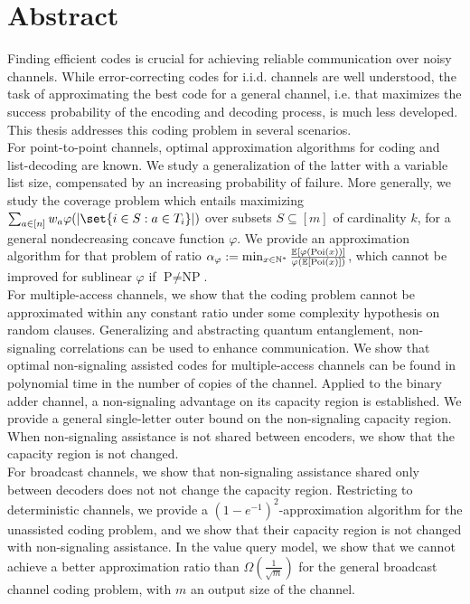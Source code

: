 \chapter*{Abstract}
Finding efficient codes is crucial for achieving reliable communication over noisy channels. While error-correcting codes for i.i.d. channels are well understood, the task of approximating the best code for a general channel, i.e. that maximizes the success probability of the encoding and decoding process, is much less developed. This thesis addresses this coding problem in several scenarios.\vspace{2mm}\\
For point-to-point channels, optimal approximation algorithms for coding and list-decoding are known. We study a generalization of the latter with a variable list size, compensated by an increasing probability of failure. More generally, we study the coverage problem which entails maximizing $\sum_{a \in [n]} w_a \varphi(\abs{\set{i \in S : a \in T_i}})$ over subsets $S \subseteq [m]$ of cardinality $k$, for a general nondecreasing concave function $\varphi$. We provide an approximation algorithm for that problem of ratio $\alpha_{\varphi} := \min_{x \in \mathbb{N}^*} \frac{\mathbb{E}[\varphi(\operatorname{\text{Poi}}(x))]}{\varphi(\mathbb{E}[\operatorname{\text{Poi}}(x)])}$, which cannot be improved for sublinear $\varphi$ if $\textrm{P}\not=\textrm{NP}$.\vspace{2mm}\\
For multiple-access channels, we show that the coding problem cannot be approximated within any constant ratio under some complexity hypothesis on random clauses. Generalizing and abstracting quantum entanglement, non-signaling correlations can be used to enhance communication. We show that optimal non-signaling assisted codes for multiple-access channels can be found in polynomial time in the number of copies of the channel. Applied to the binary adder channel, a non-signaling advantage on its capacity region is established. We provide a general single-letter outer bound on the non-signaling capacity region. When non-signaling assistance is not shared between encoders, we show that the capacity region is not changed.\vspace{2mm}\\
For broadcast channels, we show that non-signaling assistance shared only between decoders does not not change the capacity region. Restricting to deterministic channels, we provide a $(1-e^{-1})^2$-approximation algorithm for the unassisted coding problem, and we show that their capacity region is not changed with non-signaling assistance. In the value query model, we show that we cannot achieve a better approximation ratio than $\Omega\left(\frac{1}{\sqrt{m}}\right)$ for the general broadcast channel coding problem, with $m$ an output size of the channel.

